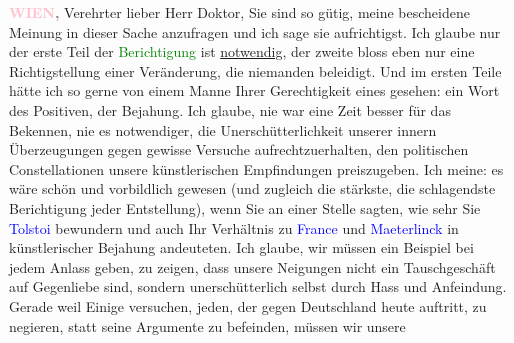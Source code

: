 \pstart
           \raggedleft{}\textcolor{gray}{\textbf{\textcolor{pink}{WIEN}\ledrightnote{\textcolor{pink}{Wien}},}}\pend
           \vspace{0.5em}
\pstart
           Verehrter lieber Herr Doktor, Sie sind so gütig, meine bescheidene
               Meinung in dieser Sache anzufragen und ich sage sie aufrichtigst. Ich glaube nur der
               erste Teil der \textcolor{green}{Berichtigung}\ledrightnote{{$\rightarrow$}\emph{\textcolor{green}{Une protestation d’Arthur Schnitzler}}}
               ist \uline{notwendig}, der zweite bloss eben nur eine
               Richtigstellung einer Veränderung, die niemanden beleidigt. Und im ersten Teile hätte
               ich so gerne von einem Manne Ihrer Gerechtigkeit eines gesehen: ein Wort des
               Positiven, der Bejahung. Ich glaube, nie war eine Zeit besser für das Bekennen, nie
               es notwendiger, die Unerschütterlichkeit unserer innern Überzeugungen gegen gewisse
               Versuche aufrechtzuerhalten, den {\pb}politischen Constellationen unsere künstlerischen Empfindungen preiszugeben. Ich
               meine: es wäre schön und vorbildlich gewesen (und zugleich die stärkste, die
               schlagendste Berichtigung jeder Entstellung), \strikeout{\textcolor{gray}{Sie}} wenn Sie an einer Stelle sagten, wie sehr Sie \textcolor{blue}{Tolstoi}\ledrightnote{\textcolor{blue}{Leo N. von Tolstoi}} bewundern und auch Ihr Verhältnis zu \textcolor{blue}{France}\ledrightnote{\textcolor{blue}{Anatole France}} und \textcolor{blue}{Maeterlinck}\ledrightnote{\textcolor{blue}{Maurice Maeterlinck}} in künstlerischer Bejahung andeuteten. Ich glaube, wir müssen
               ein Beispiel bei jedem Anlass geben, zu zeigen, dass unsere Neigungen nicht ein
               Tauschgeschäft auf Gegenliebe sind, sondern unerschütterlich selbst durch Hass und
               Anfeindung. Gerade weil Einige versuchen, jeden, der gegen Deutschland heute
               auftritt, zu negieren, statt seine Argumente zu befeinden, müssen wir unsere
